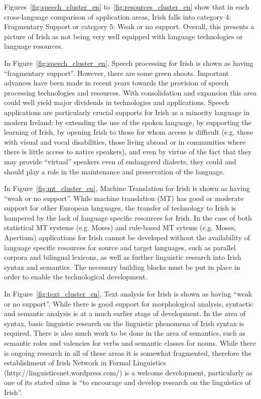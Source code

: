 \begin{multicols}{2}
Figures~\ref{fig:speech_cluster_en} to~\ref{fig:resources_cluster_en} show that in each cross-language comparison of application areas,  Irish falls into category 4: Fragmentary Support or category 5: Weak or no support. Overall, this presents a picture of Irish as not being very well equipped with language technologies or language resources. 

In Figure~\ref{fig:speech_cluster_en}, Speech processing for Irish is shown as having ``fragmentary support''. However, there are some green shoots. Important advances have been made in recent years towards the provision of speech processing technologies and resources. With consolidation and expansion this area could well yield major dividends in technologies and applications. Speech applications are particularly crucial supports for Irish as a minority language in modern Ireland: by extending the use of the spoken language, by supporting the learning of Irish, by opening Irish to those for whom access is difficult (e.g. those with visual and vocal disabilities, those living abroad or in communities where there is little access to native speakers), and even by virtue of the fact that they may provide ``virtual'' speakers even of endangered dialects, they could and should play a role in the maintenance and preservation of the language. 

In Figure~\ref{fig:mt_cluster_en}, Machine Translation for Irish is shown as having ``weak or no support''. While machine translation (MT) has good or moderate support for other European languages, the transfer of technology to Irish is hampered by the lack of language specific resources for Irish. In the case of both statistical MT systems (e.g. Moses) and rule-based MT sytems (e.g. Moses, Apertium) applications for Irish cannot be developed  without the availability of language specific resources for source and target languages, such as parallel corpora and bilingual lexicons,  as well as further linguistic research into Irish syntax and semantics. The necessary building blocks must be put in place in order to enable the technological development.

In Figure~\ref{fig:text_cluster_en}, Text analysis for Irish is shown as having ``weak or no support''. While there is good support for morphological analysis, syntactic and semantic analysis is at a much earlier stage of development. In the area of syntax, basic linguistic research on the linguistic phenomena of Irish syntax is required. There is also much work to be done in the area of semantics, such as semantic roles and valencies for verbs and semantic classes for nouns. While there is ongoing research in all of these areas it is somewhat fragmented, therefore the establishment of  Irish Network in Formal Linguistics (http://linguisticsnet.wordpress.com/) is a welcome development, particularly as one of its stated aims is ``to encourage and develop research on the linguistics of Irish''.



\end{multicols}
